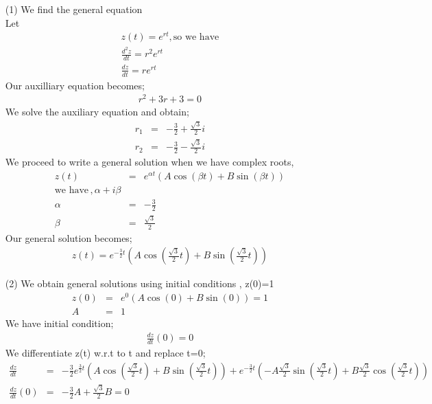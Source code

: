 \documentclass[12pt,a4paper]{article}
\begin{document}
\begin{enumerate}
\item[(1)]
We find the general equation\\
Let
\begin{eqnarray*}
z(t)=e^{rt},
\text{so we have}\\
\frac{d^2z}{dt}=r^2e^{rt}\\
\frac{dz}{dt}=re^{rt}
\end{eqnarray*}
Our auxilliary equation becomes;
\begin{eqnarray*}
r^2+3r+3=0
\end{eqnarray*}
We solve the auxiliary equation and obtain;
\begin{eqnarray*}
r_1&=&-\frac{3}{2}+\frac{\sqrt{3}}{2}i\\
r_2&=&-\frac{3}{2}-\frac{\sqrt{3}}{2}i
\end{eqnarray*}
We proceed to write a general solution when we have complex roots,
\begin{eqnarray*}
z(t)&=& e^{\alpha t}(A\cos(\beta t)+B \sin (\beta t))\\
\text{we have}\, , \alpha +i\beta\\
\alpha &=& -\frac{3}{2}\\
\beta &=& \frac{\sqrt{3}}{2}
\end{eqnarray*}
Our general solution becomes;
\begin{eqnarray*}
z(t)=e^{-\frac{3}{2} t}\left (A\cos( \frac{\sqrt{3}}{2} t)+B \sin ( \frac{\sqrt{3}}{2} t) \right)
\end{eqnarray*}
\item[(2)]
We obtain general solutions using initial conditions ,
z(0)=1\\
\begin{eqnarray*}
z(0)&=& e^0(A \cos(0)+B \sin (0))=1\\
 A&=&1
\end{eqnarray*}
We have initial condition;
\begin{eqnarray*}
 \frac{dz}{dt}(0)=0
\end{eqnarray*}
We differentiate z(t) w.r.t to t and replace t=0;
\begin{eqnarray*}
\frac{dz}{dt}&=& -\frac{3}{2}e^{\frac{3}{2}t}\left( A\cos( \frac{\sqrt{3}}{2} t)+B \sin ( \frac{\sqrt{3}}{2} t)\right)+ e^{-{\frac{3}{2}t}}\left( -A{\frac{\sqrt{3}}{2}}\sin( \frac{\sqrt{3}}{2} t)+B{\frac{\sqrt{3}}{2}} \cos ( \frac{\sqrt{3}}{2} t)\right)\\
 \frac{dz}{dt}(0)&=&-\frac{3}{2}A+{\frac{\sqrt{3}}{2}}B=0\\

\end{eqnarray*}
\end{enumerate}
\end{document}
